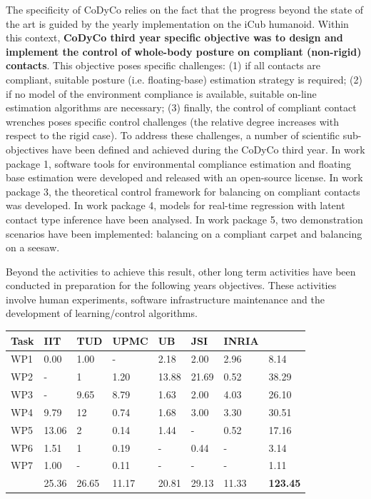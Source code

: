 \documentclass[12pt,a4paper,twoside]{article}
\begin{document}
The specificity of CoDyCo relies on the fact that the progress beyond the state of the art is guided by the yearly implementation on the iCub humanoid. Within this context, \textbf{CoDyCo third year specific objective was to design and implement the control of whole-body posture on compliant (non-rigid) contacts}. This objective poses specific challenges: (1) if all contacts are compliant, suitable posture (i.e. floating-base) estimation strategy is required; (2) if no model of the environment compliance is available, suitable on-line estimation algorithms are necessary; (3) finally, the control of compliant contact wrenches poses specific control challenges (the relative degree increases with respect to the rigid case). To address these challenges, a number of scientific sub-objectives have been defined and achieved during the CoDyCo third year. In work package 1, software tools for environmental compliance estimation and floating base estimation were developed and released with an open-source license. In work package 3, the theoretical control framework for balancing on compliant contacts was developed. In work package 4, models for real-time regression with latent contact type inference have been analysed. In work package 5, two demonstration scenarios have been implemented: balancing on a compliant carpet and balancing on a seesaw. 

Beyond the activities to achieve this result, other long term activities have been conducted in preparation for the following years objectives. These activities involve human experiments, software infrastructure maintenance and the development of learning/control algorithms.

\begin{longtable}{|C{1.5cm}|C{1.5cm}|C{1.5cm}|C{1.5cm}|C{1.5cm}|C{1.5cm}|C{1.5cm}|C{1.5cm}|}
\footnotesize \textbf{Task}& \footnotesize \textbf{IIT}&\footnotesize \textbf{TUD}&\footnotesize \textbf{UPMC}& \footnotesize \textbf{UB} &\footnotesize \textbf{JSI} &\footnotesize \textbf{INRIA} &  \\ \hline
\footnotesize WP1      &  0.00     &  1.00   &  -      &  2.18   &  2.00  &  2.96  &  8.14 \\  \hline
\footnotesize WP2      &  -        &  1      &  1.20   &  13.88  &  21.69 &  0.52  &  38.29\\  \hline
\footnotesize WP3      &  -        &  9.65   &  8.79   &  1.63   &  2.00  &  4.03  &  26.10\\  \hline
\footnotesize WP4      &  9.79     &  12     &  0.74   &  1.68   &  3.00  &  3.30  &  30.51\\  \hline
\footnotesize WP5      &  13.06    &  2      &  0.14   &  1.44   &  -     &  0.52  &  17.16\\  \hline
\footnotesize WP6      &  1.51     &  1      &  0.19   &  -      &  0.44  &  -     &   3.14\\  \hline
\footnotesize WP7      &  1.00     &  -      &  0.11   &  -      &  -     &  -     &   1.11\\  \hline
{}  &  25.36    &  26.65  &  11.17  &  20.81  &  29.13 &  11.33 &  \textbf{123.45}     \\  
\end{longtable}
\end{document}
